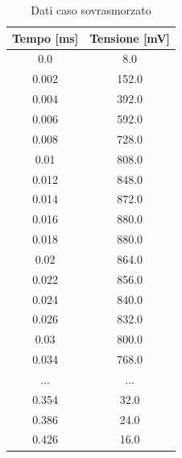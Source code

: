 \documentclass[letterpaper,12pt]{article}
\begin{document}
\begin{table}[htbp]
	\centering
	\caption{Dati caso sovrasmorzato}
	\begin{tabular}{cc}
		\toprule
		Tempo [ms] & Tensione [mV] \\
		\midrule
		0.0        & 8.0           \\
		0.002      & 152.0         \\
		0.004      & 392.0         \\
		0.006      & 592.0         \\
		0.008      & 728.0         \\
		0.01       & 808.0         \\
		0.012      & 848.0         \\
		0.014      & 872.0         \\
		0.016      & 880.0         \\
		0.018      & 880.0         \\
		0.02       & 864.0         \\
		0.022      & 856.0         \\
		0.024      & 840.0         \\
		0.026      & 832.0         \\
		0.03       & 800.0         \\
		0.034      & 768.0         \\
		...        & ...           \\
		0.354      & 32.0          \\
		0.386      & 24.0          \\
		0.426      & 16.0          \\
		\bottomrule
	\end{tabular}
	\label{tab:dati_RLC_svsm}
\end{table}
\end{document}
